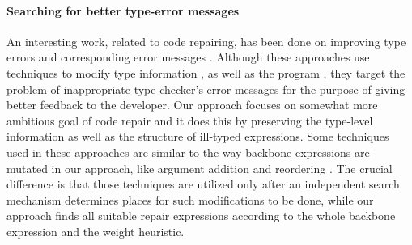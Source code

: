 \paragraph{{\bf Searching for better type-error messages}}
An interesting work, related to code repairing, has been done on improving type
errors and corresponding error messages
\cite{McAdam01repairingtype,Lerner:2006:SSM:1159876.1159887,Lerner:2007:STM:1250734.1250783}.
Although these approaches use techniques
to modify type information \cite{McAdam01repairingtype}, as well as the program
\cite{Lerner:2007:STM:1250734.1250783}, they target the problem of
inappropriate type-checker's error messages for the purpose of giving better feedback to the developer.
Our approach focuses on somewhat more ambitious goal of code repair and it does
this by preserving the type-level information as well as the structure of
ill-typed expressions.
Some techniques used in these approaches are similar to the way backbone
expressions are mutated in our approach, like argument addition and reordering
\cite{Lerner:2007:STM:1250734.1250783}.
The crucial difference is that those techniques are utilized only after an
independent search mechanism determines places for such modifications to be
done, while our approach finds all suitable repair expressions according
to the whole backbone expression and the weight heuristic.

\vspace{-0.5em}
